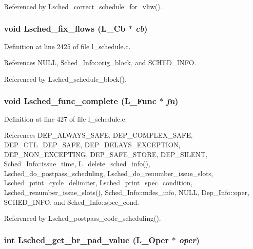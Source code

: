 Referenced by Lsched\_\-correct\_\-schedule\_\-for\_\-vliw().
\subsubsection{\setlength{\rightskip}{0pt plus 5cm}void Lsched\_\-fix\_\-flows (L\_\-Cb $\ast$ {\em cb})}\label{l__schedule_8c_9a49b776bfb91fe021d561770910b8a2}




Definition at line 2425 of file l\_\-schedule.c.

References NULL, Sched\_\-Info::orig\_\-block, and SCHED\_\-INFO.

Referenced by Lsched\_\-schedule\_\-block().
\subsubsection{\setlength{\rightskip}{0pt plus 5cm}void Lsched\_\-func\_\-complete (L\_\-Func $\ast$ {\em fn})}\label{l__schedule_8c_548bd94fba94b9dfa0fb7dfea903bbd4}




Definition at line 427 of file l\_\-schedule.c.

References DEP\_\-ALWAYS\_\-SAFE, DEP\_\-COMPLEX\_\-SAFE, DEP\_\-CTL\_\-DEP\_\-SAFE, DEP\_\-DELAYS\_\-EXCEPTION, DEP\_\-NON\_\-EXCEPTING, DEP\_\-SAFE\_\-STORE, DEP\_\-SILENT, Sched\_\-Info::issue\_\-time, L\_\-delete\_\-sched\_\-info(), Lsched\_\-do\_\-postpass\_\-scheduling, Lsched\_\-do\_\-renumber\_\-issue\_\-slots, Lsched\_\-print\_\-cycle\_\-delimiter, Lsched\_\-print\_\-spec\_\-condition, Lsched\_\-renumber\_\-issue\_\-slots(), Sched\_\-Info::mdes\_\-info, NULL, Dep\_\-Info::oper, SCHED\_\-INFO, and Sched\_\-Info::spec\_\-cond.

Referenced by Lsched\_\-postpass\_\-code\_\-scheduling().
\subsubsection{\setlength{\rightskip}{0pt plus 5cm}int Lsched\_\-get\_\-br\_\-pad\_\-value (L\_\-Oper $\ast$ {\em oper})}\label{l__schedule_8c_e4c45c26b8351919c84a714d5f98882f}




